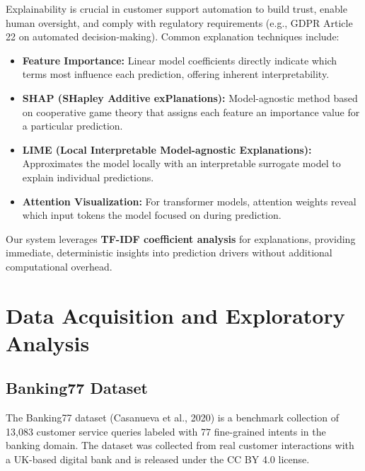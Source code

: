 \documentclass[12pt,a4paper]{article}
\begin{document}
Explainability is crucial in customer support automation to build trust, enable human oversight, and comply with regulatory requirements (e.g., GDPR Article 22 on automated decision-making). Common explanation techniques include:

\begin{itemize}[leftmargin=*]
    \item \textbf{Feature Importance:} Linear model coefficients directly indicate which terms most influence each prediction, offering inherent interpretability.
    \item \textbf{SHAP (SHapley Additive exPlanations):} Model-agnostic method based on cooperative game theory that assigns each feature an importance value for a particular prediction.
    \item \textbf{LIME (Local Interpretable Model-agnostic Explanations):} Approximates the model locally with an interpretable surrogate model to explain individual predictions.
    \item \textbf{Attention Visualization:} For transformer models, attention weights reveal which input tokens the model focused on during prediction.
\end{itemize}

Our system leverages \textbf{TF-IDF coefficient analysis} for explanations, providing immediate, deterministic insights into prediction drivers without additional computational overhead.

\newpage
\section{Data Acquisition and Exploratory Analysis}
\label{sec:data}

\subsection{Banking77 Dataset}
\label{subsec:banking77}

The Banking77 dataset (Casanueva et al., 2020) is a benchmark collection of 13,083 customer service queries labeled with 77 fine-grained intents in the banking domain. The dataset was collected from real customer interactions with a UK-based digital bank and is released under the CC BY 4.0 license.
\end{document}
